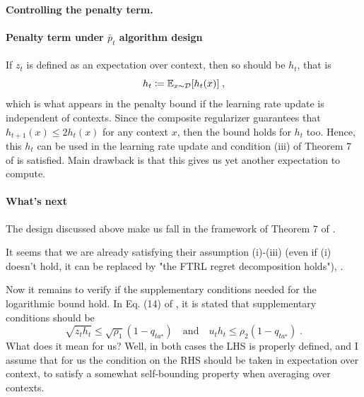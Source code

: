 \paragraph{Controlling the penalty term.}  



\paragraph{Penalty term under $\bar p_t$ algorithm design} If $z_t$ is defined as an expectation over context, then so should be $h_t$, that is 
\[h_t \coloneqq \mathbb{E}_{x \sim \mathcal{D}}[h_t(x)] \;, \]
which is what appears in the penalty bound if the learning rate update is independent of contexts.
Since the composite regularizer guarantees that $h_{t+1}(x)\leq 2h_t(x)$ for any context $x$, then the bound holds for $h_t$ too. Hence, this $h_t$ can be used in the learning rate update and condition (iii) of Theorem 7 of \cite{BOBWhardproblems} is satisfied. Main drawback is that this gives us yet another expectation to compute.

\paragraph{What's next} The design discussed above make us fall in the framework of Theorem 7 of \cite{BOBWhardproblems}. 

It seems that we are already satisfying their assumption (i)-(iii) (even if (i) doesn't hold, it can be replaced by "the FTRL regret decomposition holds"), . 

Now it remains to verify if the supplementary conditions needed for the logarithmic bound hold. In Eq. (14) of \cite{BOBWhardproblems}, it is stated that supplementary conditions should be 
\[\sqrt{z_t h_t}\leq \sqrt{\rho_1} (1-q_{t a^\star})  \quad \text{and} \quad u_t h_t \leq \rho_2 (1-q_{ta^\star}) \;. 
\]
What does it mean for us? Well, in both cases the LHS is properly defined, and I assume that for us the condition on the RHS should be taken in expectation over context, to satisfy a somewhat self-bounding property when averaging over contexts. 

